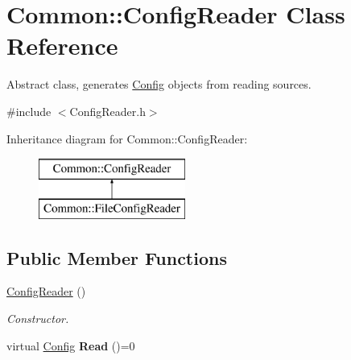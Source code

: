 \hypertarget{class_common_1_1_config_reader}{\section{Common\-:\-:Config\-Reader Class Reference}
\label{class_common_1_1_config_reader}
}


Abstract class, generates \hyperlink{class_common_1_1_config}{Config} objects from reading sources.  




{\ttfamily \#include $<$Config\-Reader.\-h$>$}

Inheritance diagram for Common\-:\-:Config\-Reader\-:\begin{figure}[H]
\begin{center}
\leavevmode
\includegraphics[height=2.000000cm]{class_common_1_1_config_reader}
\end{center}
\end{figure}
\subsection*{Public Member Functions}
\begin{DoxyCompactItemize}
\item 
\hypertarget{class_common_1_1_config_reader_a05f7bf0dca8d6cc11d7704936295c5c5}{\hyperlink{class_common_1_1_config_reader_a05f7bf0dca8d6cc11d7704936295c5c5}{Config\-Reader} ()}\label{class_common_1_1_config_reader_a05f7bf0dca8d6cc11d7704936295c5c5}

\begin{DoxyCompactList}\small\item\em Constructor. \end{DoxyCompactList}\item 
\hypertarget{class_common_1_1_config_reader_a261b278710c6b4de7e01a9eeae44f2c4}{virtual \hyperlink{class_common_1_1_config}{Config} {\bfseries Read} ()=0}\label{class_common_1_1_config_reader_a261b278710c6b4de7e01a9eeae44f2c4}

\end{DoxyCompactItemize}
